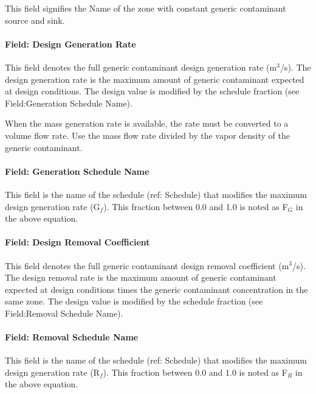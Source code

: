 This field signifies the Name of the zone with constant generic contaminant source and sink.

\paragraph{Field: Design Generation Rate}\label{field-design-generation-rate-1}

This field denotes the full generic contaminant design generation rate (m\(^{3}\)/s). The design generation rate is the maximum amount of generic contaminant expected at design conditions. The design value is modified by the schedule fraction (see Field:Generation Schedule Name).

When the mass generation rate is available, the rate must be converted to a volume flow rate. Use the mass flow rate divided by the vapor density of the generic contaminant.

\paragraph{Field: Generation Schedule Name}\label{field-generation-schedule-name}

This field is the name of the schedule (ref: Schedule) that modifies the maximum design generation rate (G\(_{f}\)). This fraction between 0.0 and 1.0 is noted as F\(_{G}\) in the above equation.

\paragraph{Field: Design Removal Coefficient}\label{field-design-removal-coefficient}

This field denotes the full generic contaminant design removal coefficient (m\(^{3}\)/s). The design removal rate is the maximum amount of generic contaminant expected at design conditions times the generic contaminant concentration in the same zone. The design value is modified by the schedule fraction (see Field:Removal Schedule Name).

\paragraph{Field: Removal Schedule Name}\label{field-removal-schedule-name}

This field is the name of the schedule (ref: Schedule) that modifies the maximum design generation rate (R\(_{f}\)). This fraction between 0.0 and 1.0 is noted as F\(_{R}\) in the above equation.

